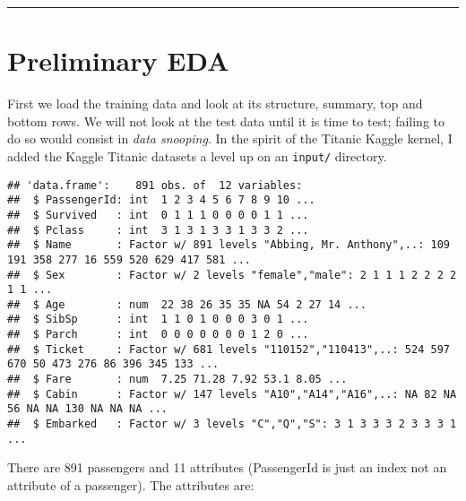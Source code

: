 \documentclass[]{article}
\begin{document}
\begin{center}\rule{0.5\linewidth}{\linethickness}\end{center}

\hypertarget{prelimEDA-link}{\section{Preliminary
EDA}\label{prelimEDA-link}}

First we load the training data and look at its structure, summary, top
and bottom rows. We will not look at the test data until it is time to
test; failing to do so would consist in \emph{data snooping}. In the
spirit of the Titanic Kaggle kernel, I added the Kaggle Titanic datasets
a level up on an \texttt{input/} directory.

\begin{verbatim}
## 'data.frame':    891 obs. of  12 variables:
##  $ PassengerId: int  1 2 3 4 5 6 7 8 9 10 ...
##  $ Survived   : int  0 1 1 1 0 0 0 0 1 1 ...
##  $ Pclass     : int  3 1 3 1 3 3 1 3 3 2 ...
##  $ Name       : Factor w/ 891 levels "Abbing, Mr. Anthony",..: 109 191 358 277 16 559 520 629 417 581 ...
##  $ Sex        : Factor w/ 2 levels "female","male": 2 1 1 1 2 2 2 2 1 1 ...
##  $ Age        : num  22 38 26 35 35 NA 54 2 27 14 ...
##  $ SibSp      : int  1 1 0 1 0 0 0 3 0 1 ...
##  $ Parch      : int  0 0 0 0 0 0 0 1 2 0 ...
##  $ Ticket     : Factor w/ 681 levels "110152","110413",..: 524 597 670 50 473 276 86 396 345 133 ...
##  $ Fare       : num  7.25 71.28 7.92 53.1 8.05 ...
##  $ Cabin      : Factor w/ 147 levels "A10","A14","A16",..: NA 82 NA 56 NA NA 130 NA NA NA ...
##  $ Embarked   : Factor w/ 3 levels "C","Q","S": 3 1 3 3 3 2 3 3 3 1 ...
\end{verbatim}

There are 891 passengers and 11 attributes (PassengerId is just an index
not an attribute of a passenger). The attributes are:
\end{document}

